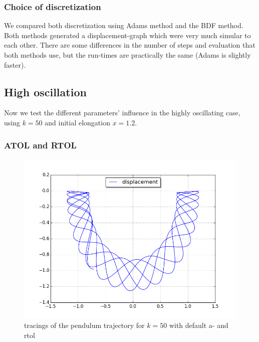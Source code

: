 \documentclass[a4paper,11pt]{article}
\theoremstyle{mytheor}
\begin{document}
\subsubsection*{Choice of discretization}
We compared both discretization using Adams method and the BDF method. Both methods generated a displacement-graph which were very much simular to each other. There are some differences in the number of steps and evaluation that both methods use, but the run-times are practically the same (Adams is slightly faster).

\subsection*{High oscillation}
Now  we test the different parameters' influence in the highly oscillating case, using $k = 50$ and initial elongation $x = 1.2$.

\subsubsection*{ATOL and RTOL}


\begin{figure}[!h]
\centering
\includegraphics[scale=0.5]{task1_k50_utdrag12_default.png}
\caption{tracings of the pendulum trajectory for $k = 50$ with default a- and rtol}
\label{3k10at01}
\end{figure}
\end{document}
